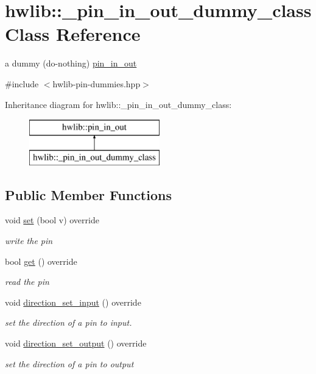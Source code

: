 \hypertarget{classhwlib_1_1__pin__in__out__dummy__class}{}\section{hwlib\+:\+:\+\_\+pin\+\_\+in\+\_\+out\+\_\+dummy\+\_\+class Class Reference}
\label{classhwlib_1_1__pin__in__out__dummy__class}


a dummy (do-\/nothing) \hyperlink{classhwlib_1_1pin__in__out}{pin\+\_\+in\+\_\+out}  




{\ttfamily \#include $<$hwlib-\/pin-\/dummies.\+hpp$>$}

Inheritance diagram for hwlib\+:\+:\+\_\+pin\+\_\+in\+\_\+out\+\_\+dummy\+\_\+class\+:\begin{figure}[H]
\begin{center}
\leavevmode
\includegraphics[height=2.000000cm]{classhwlib_1_1__pin__in__out__dummy__class}
\end{center}
\end{figure}
\subsection*{Public Member Functions}
\begin{DoxyCompactItemize}
\item 
void \hyperlink{classhwlib_1_1__pin__in__out__dummy__class_afd92206adb4c05526a84d8e7ff17491c}{set} (bool v) override
\begin{DoxyCompactList}\small\item\em write the pin \end{DoxyCompactList}\item 
bool \hyperlink{classhwlib_1_1__pin__in__out__dummy__class_aa3a8d3f46143f6bb042444dee00c34c6}{get} () override
\begin{DoxyCompactList}\small\item\em read the pin \end{DoxyCompactList}\item 
void \hyperlink{classhwlib_1_1__pin__in__out__dummy__class_a29f385015d361cfa434a625ca8331cd7}{direction\+\_\+set\+\_\+input} () override
\begin{DoxyCompactList}\small\item\em set the direction of a pin to input. \end{DoxyCompactList}\item 
void \hyperlink{classhwlib_1_1__pin__in__out__dummy__class_a551f4d543e9fccd85ad843cbd9258a94}{direction\+\_\+set\+\_\+output} () override
\begin{DoxyCompactList}\small\item\em set the direction of a pin to output \end{DoxyCompactList}\end{DoxyCompactItemize}


